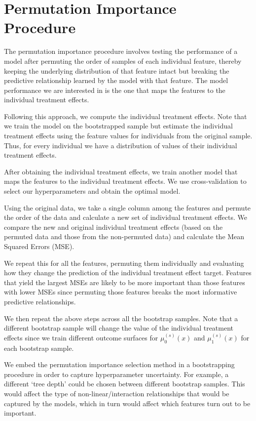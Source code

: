 \documentclass[12pt, a4paper]{article}
\begin{document}
\clearpage

\section{Permutation Importance Procedure}
\label{app:perm}

The permutation importance procedure involves testing the performance of a
model after permuting the order of samples of each individual feature, thereby
keeping the underlying distribution of that feature intact but breaking the
predictive relationship learned by the model with that feature. The model
performance we are interested in is the one that maps
the features to the individual treatment effects. 

Following this approach, we compute the individual treatment effects. Note that we train the model on the bootstrapped sample but estimate the individual
treatment effects using the feature values for individuals from the original
sample. Thus, for every individual we have a distribution of values of their
individual treatment effects.

After obtaining the individual treatment effects, we train another model that
maps the features to the individual treatment effects. We use cross-validation
to select our hyperparameters and obtain the optimal model. 

Using the original data, we take a single column among the features and
permute the order of the data and calculate a new set of individual treatment
effects. We compare the new and original individual treatment effects (based on
the permuted data and those from the non-permuted data) and calculate the Mean
Squared Errors (MSE). 

We repeat this for all the features, permuting them individually and evaluating
how they change the prediction of the individual treatment effect target.
Features that yield the largest MSEs are likely to be more important than those
features with lower MSEs since permuting those features breaks the
most informative predictive relationships. 

We then repeat the above steps across all the bootstrap samples. Note that a
different bootstrap sample will change the value of the individual treatment
effects since we train different outcome surfaces for $\mu^{(s)}_0(x)$ and
$\mu^{(s)}_1(x)$ for each bootstrap sample.

We embed the permutation importance selection method in a bootstrapping
procedure in order to capture hyperparameter uncertainty. For example, a
different `tree depth' could be chosen between different bootstrap samples.
This would affect the type of non-linear/interaction relationships that would
be captured by the models, which in turn would affect which features turn out
to be important. 
\end{document}
